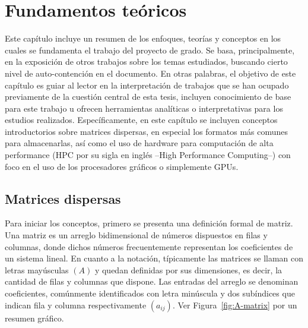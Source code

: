 \chapter{Fundamentos teóricos}\label{ch:fundamento-teorico}

Este capítulo incluye un resumen de los enfoques, teorías y conceptos en los cuales se fundamenta el trabajo del proyecto de grado. Se basa, principalmente, en la exposición de otros trabajos sobre los temas estudiados, buscando cierto nivel de auto-contención en el documento. En otras palabras, el objetivo de este capítulo es guiar al lector en la interpretación de trabajos que se han ocupado previamente de la cuestión central de esta tesis, incluyen conocimiento de base para este trabajo u ofrecen herramientas analíticas o interpretativas para los estudios realizados. 
Específicamente, en este capítulo se incluyen conceptos introductorios sobre matrices dispersas, en especial los formatos más comunes para almacenarlas, así como el uso de hardware para computación de alta performance (HPC por su sigla en inglés --High Performance Computing--) con foco en el uso de los procesadores gráficos o simplemente GPUs.


\section{Matrices dispersas} \label{sparse-intro}

Para iniciar los conceptos, primero se presenta una definición formal de matriz. Una matriz es un arreglo bidimensional de números dispuestos en filas y columnas, donde dichos números frecuentemente representan los coeficientes de un sistema lineal. En cuanto a la notación, típicamente las matrices se llaman con letras mayúsculas $(A)$ y quedan definidas por sus dimensiones, es decir, la cantidad de filas y columnas que dispone. Las entradas del arreglo se denominan coeficientes, comúnmente identificados con letra minúscula y dos subíndices que indican fila y columna respectivamente $(a_{ij})$. Ver Figura~\ref{fig:A-matrix} por un resumen gráfico.



